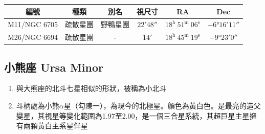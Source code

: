 \begin{center}
\begin{longtable}{c | c | c | c | c | c}
    編號 & 種類 & 別名 & 視尺寸 & RA & Dec \\
    \hline
    \endfirsthead


    \endfoot

    \endlastfoot

    M11/NGC 6705 & 疏散星團 & 野鴨星團 & \(\ang{;22;48}\) & \(18^\text{h }51^\text{m }06^\text{s}\) & \(-\ang{6;16;11}\) \\ %
    M26/NGC 6694 & 疏散星團 & - & \(\ang{;14;}\) & \(18^\text{h }45^\text{m }19^\text{s}\) & \(-\ang{9;23;0}\) \\ %
\end{longtable}
\end{center}

\subsection{小熊座 Ursa Minor}
\begin{enumerate}
    \item 與大熊座的北斗七星相似的形狀，被稱為小北斗
    \item 斗柄處為小熊\(\alpha\)星（勾陳一），為現今的北極星。顏色為黃白色。是最亮的造父變星，其視星等變化範圍為1.97至2.00，是一個三合星系統，其超巨星主星擁有兩顆黃白主系星伴星
\end{enumerate}